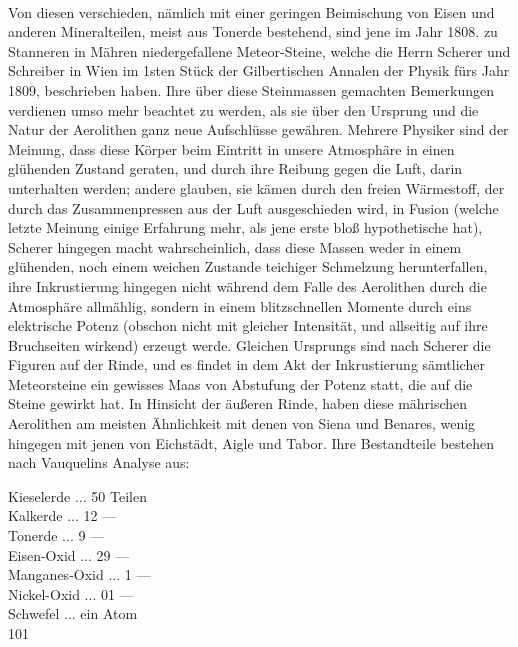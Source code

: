 \documentclass[a4paper, 11pt, oneside, polutonikogreek, german]{article}
\begin{document}
\paragraph{}
Von diesen verschieden, nämlich mit einer geringen Beimischung von Eisen und anderen Mineralteilen, meist aus Tonerde bestehend, sind jene im Jahr 1808. zu Stanneren in Mähren niedergefallene Meteor-Steine, welche die Herrn Scherer und Schreiber in Wien im 1sten Stück der Gilbertischen Annalen der Physik fürs Jahr 1809, beschrieben haben. Ihre über diese Steinmassen gemachten Bemerkungen verdienen umso mehr beachtet zu werden, als sie über den Ursprung und die Natur der Aerolithen ganz neue Aufschlüsse gewähren. Mehrere Physiker sind der Meinung, dass diese Körper beim Eintritt in unsere Atmosphäre in einen glühenden Zustand geraten, und durch ihre Reibung gegen die Luft, darin unterhalten werden; andere glauben, sie kämen durch den freien Wärmestoff, der durch das Zusammenpressen aus der Luft ausgeschieden wird, in Fusion (welche letzte Meinung einige Erfahrung mehr, als jene erste bloß hypothetische hat), Scherer hingegen macht wahrscheinlich, dass diese Massen weder in einem glühenden, noch einem weichen Zustande teichiger Schmelzung herunterfallen, ihre Inkrustierung hingegen nicht während dem Falle des Aerolithen durch die Atmosphäre allmählig, sondern in einem blitzschnellen Momente durch eins elektrische Potenz (obschon nicht mit gleicher Intensität, und allseitig auf ihre Bruchseiten wirkend) erzeugt werde. Gleichen Ursprungs sind nach Scherer die Figuren auf der Rinde, und es findet in dem Akt der Inkrustierung sämtlicher Meteorsteine ein gewisses Maas von Abstufung der Potenz statt, die auf die Steine gewirkt hat. In Hinsicht der äußeren Rinde, haben diese mährischen Aerolithen am meisten Ähnlichkeit mit denen von Siena und Benares, wenig hingegen mit jenen von Eichstädt, Aigle und Tabor. Ihre Bestandteile bestehen nach Vauquelins Analyse aus:

Kieselerde ... 50 Teilen\\
\hspace*{0.5cm} Kalkerde ... 12 ---\\
\hspace*{0.5cm} Tonerde ... 9 ---\\
\hspace*{0.5cm} Eisen-Oxid ... 29 ---\\
\hspace*{0.5cm} Manganes-Oxid ... 1 ---\\
\hspace*{0.5cm} Nickel-Oxid ... 01 ---\\
\hspace*{0.5cm} Schwefel ... ein Atom\\
\hspace*{2.5cm} 101
\end{document}
